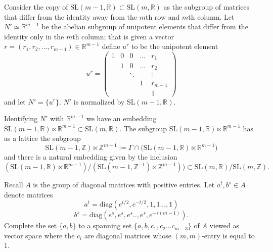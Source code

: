\documentclass[10pt,reqno]{amsart}
\theoremstyle{Theorem}
\theoremstyle{definition}
\theoremstyle{remark}
\newcommand{\R}{\mathbb {R}}
\newcommand{\Z}{\mathbb {Z}}
\newcommand{\Sl}{\mathrm{SL}}
\begin{document}
Consider the copy of  $\Sl(m-1, \R)\subset \Sl(m,\R)$ as the subgroup of matrices that differ from the identity away from the $m$th row and $m$th column.  Let $N'\simeq \R^{m-1}$ be the abelian  subgroup of unipotent elements that differ from the identity only in the $m$th column; that is given a vector $r = (r_1,r_2, \dots, r_{m-1})\in \R^{m-1}$ define $u^{r}$ to be the unipotent element
\begin{equation}\label{eq:formerlyknownas}
u^r= \left(\begin{array}{ccccc}1  &  0  & 0  & \dots  & r_1  \\  & 1  &   0 & \dots  & r_2  \\  &   &  \ddots &   &  \vdots  \\  &   &   &  1 &  r_{m-1} \\  &   &   &   &1  \end{array}\right)\end{equation}
and let $N'= \{u^r\}$.  $N'$ is normalized by $\Sl(m-1,\R)$.

Identifying $N'$ with $\R^{m-1}$ we have an embedding
   $\Sl(m-1, \R) \ltimes \R^{m-1}  \subset \Sl(m,\R)$.  %
The subgroup $\Sl(m-1, \R) \ltimes \R^{m-1}$ has as a  lattice the subgroup $$\Sl(m-1, \Z) \ltimes \Z^{m-1}:= \Gamma \cap\big( \Sl(m-1, \R) \ltimes \R^{m-1}\big)$$ and there is a natural embedding given by the inclusion $$(\Sl(m-1,\R)\ltimes \R^{m-1}) / (\Sl(m-1, \Z^{-1}) \ltimes \Z^{m-1})) \subset \Sl(m,\R) / \Sl(m,\Z).$$

Recall $A$ is the group of diagonal matrices with positive entries.
Let $a^t, b^s \in A$ denote matrices
$$a^t = \text{diag}(e^{t/2}, e^{-t/2}, 1,1...,1)$$
$$b^s= \text{diag}(e^s, e^{s}, e^{s}..,e^{s}, e^{-s(m-1)}).$$
Complete the set  $\{a,b\}$  to a spanning set  $\{a,b, c_1, c_2 \dots c_{m-3}\}$ of $A$ viewed as vector space where the $c_i$ are diagonal matrices whose $(m,m)$-entry is equal to $1$.
\end{document}
